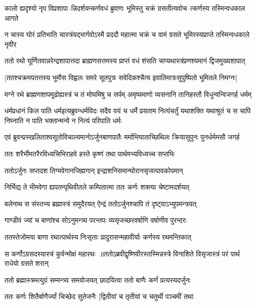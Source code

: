 \twolineshloka
{कालो ह्यदृश्यो नृप विप्रशापा--न्निदर्शयन्कर्णवधं ब्रुवाणः}
{भूमिस्तु चक्रं ग्रसतीत्यवोच--त्कर्णस्य तस्मिन्वधकाल आगते}


\twolineshloka
{न चास्य घोरं प्रतिभाति चास्त्रंयद्भार्गवोऽस्मै प्रददौ महात्मा}
{चक्रं च वामं ग्रसते भूमिरस्यप्राप्ते तस्मिन्वधकाले नृवीर}


\twolineshloka
{ततो रथो घूर्णितवान्नरेन्द्रशापात्तदा ब्राह्मणसत्तमस्य}
{प्राप्तं वधं शंसति चाप्यथास्त्रंप्रणश्यमानं द्विजमुख्यशापात्}


\twolineshloka
{[ततश्चक्रमपतत्तस्य भूमौस विह्वलः समरे सूतपुत्रः}
{सवेदिकश्चैत्य इवातिमात्रःसुपुष्पितो भूमितले निमग्नः]}


\twolineshloka
{मग्ने रथे ब्राह्मणशापमूढोह्यस्त्रं च तं मोघमिषु च सर्पम्}
{अमृष्यमाणो व्यसनानि तानिहस्तौ विधुन्वन्विजगर्ह धर्मम्}


\threelineshloka
{धर्मप्रधानं किल पाति धर्मइत्यब्रुवन्धर्मविदः सदैव}
{वयं च धर्मे प्रयताम नित्यंचर्तुं यथाशक्ति यथाश्रुतं च}
{स चापि निघ्नाति न पाति भक्तान्मन्ये न नित्यं परिपाति धर्मः}


\twolineshloka
{एवं ब्रुवन्प्रस्खलिताश्वसूतोविचाल्यमानोऽर्जुनबाणपातैः}
{मर्माभिघाताच्छिथिलः क्रियासुपुनः पुनर्धर्ममसौ जगर्ह}


\twolineshloka
{ततः शरैर्भीमतरैरविध्यत्त्रिभिराहवे}
{हस्ते कृष्णं तथा पार्थमभ्यविध्यच्च सप्तभिः}


\twolineshloka
{ततोऽर्जुनः सप्तदश तिग्मवेगानजिह्मगान्}
{इन्द्राशनिसमान्घोरानसृजत्पावकोपमान्}


\twolineshloka
{निर्भिद्य ते भीमवेगा ह्यपतन्पृथिवीतले}
{कम्पितात्मा ततः कर्णः शक्त्या चेष्टामदर्शयत्}


\twolineshloka
{बलेनाथ स संस्तभ्य ब्रह्मास्त्रं समुदैरयत्}
{ऐन्द्रं ततोऽर्जुनश्चापि तं दृष्ट्वाऽभ्युपमन्त्रयत्}


\twolineshloka
{गाण्डीवं ज्यां च बाणांश्च सोऽनुमन्त्र्य परन्तपः}
{व्यसृजच्छरवर्षाणि वर्षाणीव पुरन्दरः}


\threelineshloka
{ततस्तेजोमया बाणा रथात्पार्थस्य निःसृताः}
{प्रादुरासन्महावीर्याः कर्णस्य रथमन्तिकात्}
{}


\twolineshloka
{स कर्णोऽग्रसदस्यास्त्रं कुर्वन्मोक्षं महारथः ॥ततोऽब्रवीद्वृष्णिवीरस्तस्मिन्नस्त्रे विनाशिते}
{विसृजास्त्रं परं पार्थ राधेयो ग्रसते शरान्}


\twolineshloka
{ततो ब्रह्मास्त्रमत्युग्रं सम्मन्त्र्य समयोजयत्}
{छादयित्वा ततो बाणैः कर्णं प्रत्यस्यदर्जुनः}


\twolineshloka
{ततः कर्णः शितैर्बाणैर्ज्यां चिच्छेद सुतेजनैः}
{[द्वितीयां च तृतीयां च चतुर्थी पञ्चमीं तथा}


